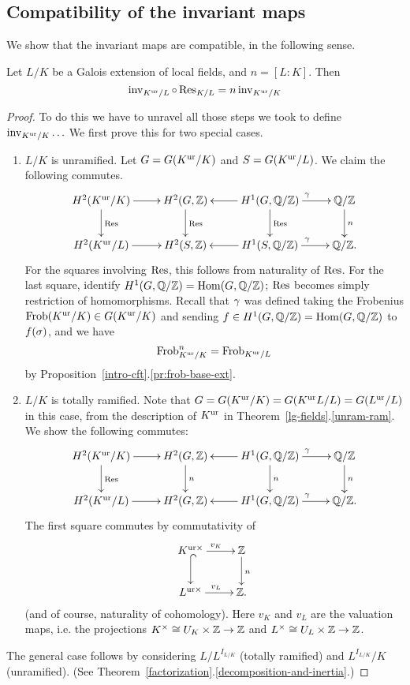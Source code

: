 \subsection{Compatibility of the invariant maps}
We show that the invariant maps are compatible, in the following sense.
\begin{thm}
Let $L/K$ be a Galois extension of local fields, and $n=[L:K]$. Then
\[
\operatorname{inv}_{K^{\text{ur}}/L}\circ \operatorname{Res}_{K/L}=n\operatorname{inv}_{K^{\text{ur}} /K}
\]
\end{thm}
\begin{proof}
To do this we have to unravel all those steps we took to define $\operatorname{inv}_{K^{\text{ur}}/K}\ldots$ We first prove this for two special cases.
\begin{enumerate}
\item $L/K$ is unramified. Let $G=G(K^{\text{ur}}/K)$ and $S=G(K^{\text{ur}}/L)$. We claim the following commutes.
\[
\xymatrix{
 H^2(K\ur/K) \ar[r]\ar[d]^{\Res} & H^2(G,\Z)\ar[d]^{\Res} & H^1(G, \Q/\Z)\ar[l]\ar[r]^{\ga} \ar[d]^{\Res} & \Q/\Z\ar[d]^n\\
 H^2(K\ur /L)\ar[r] & H^2(S,\Z) & H^1(S, \Q/\Z) \ar[l]\ar[r]^{\ga} & \Q/\Z.
}
\] 
For the squares involving $\operatorname{Res}$, this follows from naturality of $\operatorname{Res}$. For the last square, identify $H^1(G,\mathbb{Q}/\mathbb{Z})=\operatorname{Hom}(G,\mathbb{Q}/\mathbb{Z})$; $\operatorname{Res}$ becomes simply restriction of homomorphisms.
Recall that $\gamma$ was defined taking the Frobenius $\operatorname{Frob}(K^{\text{ur}}/K)\in G(K^{\text{ur}}/K)$ and sending $f\in H^1(G,\mathbb{Q}/\mathbb{Z})=\operatorname{Hom}(G,\mathbb{Q}/\mathbb{Z})$ to $f(\sigma)$, and we have
\[
\operatorname{Frob}_{K^{\text{ur}}/K}^{n}=\operatorname{Frob}_{K^{\text{ur}} /L}
\]
by Proposition~\ref{intro-cft}.\ref{pr:frob-base-ext}.
\item $L/K$ is totally ramified. 
Note that $G=G(K^{\text{ur}}/K)=G(K^{\text{ur}} L/L)=G(L^{\text{ur}}/L)$ in this case, from the description of $K^{\text{ur}}$ in Theorem~\ref{lg-fields}.\ref{unram-ram}. 
We show the following commutes:
\[
\xymatrix{
H^2(K\ur/K) \ar[r]\ar[d]^{\Res} & H^2(G,\Z)\ar[d]^{n} & H^1(G, \Q/\Z)\ar[l]\ar[r]^{\ga} \ar[d]^{n} & \Q/\Z\ar[d]^n\\
H^2(K\ur /L)\ar[r] & H^2(G,\Z) & H^1(G, \Q/\Z) \ar[l]\ar[r]^{\ga} & \Q/\Z.
}
\]
The first square commutes by commutativity of
\[
\xymatrix{
K\urt \ar[r]^{v_K}\ar@{^(->}[d] & \Z\ar[d]^n\\
L\urt \ar[r]^{v_L} & \Z.
}
\] 
(and of course, naturality of cohomology). Here $v_K$ and $v_L$ are the valuation maps, i.e. the projections $K^{\times}\cong U_K\times \mathbb{Z}\to \mathbb{Z}$ and $L^{\times}\cong U_L\times \mathbb{Z}\to \mathbb{Z}$.
\end{enumerate}
The general case follows by considering $L/L^{I_{L/K}}$ (totally ramified) and $L^{I_{L/K}}/K$ (unramified). (See Theorem~\ref{factorization}.\ref{decomposition-and-inertia}.)
\end{proof}
